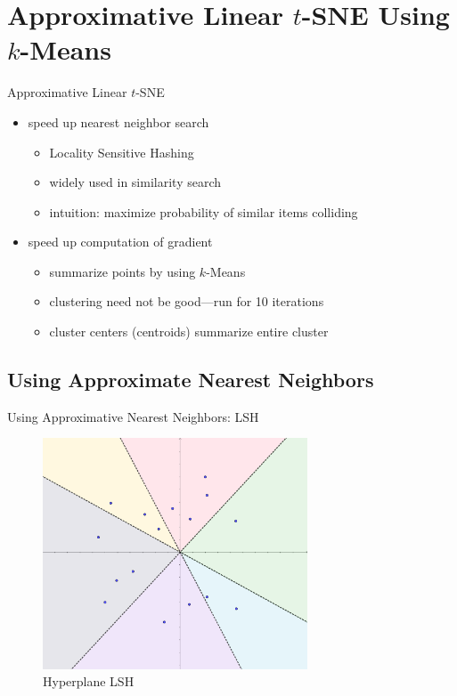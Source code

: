 \documentclass{beamer}
\begin{document}
\section{Approximative Linear $t$-SNE Using $k$-Means}

\begin{frame}[fragile]{Approximative Linear $t$-SNE}
    \begin{itemize}
        \item speed up nearest neighbor search
            \begin{itemize}
                \item Locality Sensitive Hashing
                \item widely used in similarity search
                \item intuition: maximize probability of similar items colliding
            \end{itemize}
        \item speed up computation of gradient
            \begin{itemize}
                \item summarize points by using $k$-Means
                \item clustering need not be good---run for 10 iterations
                \item cluster centers (centroids) summarize entire cluster
            \end{itemize}
    \end{itemize}
\end{frame}

\subsection{Using Approximate Nearest Neighbors}

\begin{frame}[fragile]{Using Approximative Nearest Neighbors: LSH}
    \begin{figure}[h]
        \centering
        \includegraphics[width=0.7\textwidth]{srp}
        \caption{Hyperplane LSH}
    \end{figure}
\end{frame}
\end{document}
